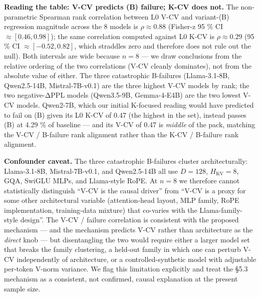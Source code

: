 \documentclass[
]{article}
\begin{document}
\textbf{Reading the table: V-CV predicts (B) failure; K-CV does not.}
The non-parametric Spearman rank correlation between L0 V-CV and
variant-(B) regression magnitude across the 8 models is
\(\rho \approx 0.88\) (Fisher-z 95 \% CI \(\approx [0.46, 0.98]\)); the
same correlation computed against L0 K-CV is \(\rho \approx 0.29\) (95
\% CI \(\approx [-0.52, 0.82]\), which straddles zero and therefore does
not rule out the null). Both intervals are wide because \(n = 8\) --- we
draw conclusions from the relative ordering of the two correlations
(V-CV cleanly dominates), not from the absolute value of either. The
three catastrophic B-failures (Llama-3.1-8B, Qwen2.5-14B,
Mistral-7B-v0.1) are the three highest V-CV models by rank; the two
negative-ΔPPL models (Qwen3.5-9B, Gemma-4-E4B) are the two lowest V-CV
models. Qwen2-7B, which our initial K-focused reading would have
predicted to fail on (B) given its L0 K-CV of 0.47 (the highest in the
set), instead passes (B) at 4.29 \% of baseline --- and its V-CV of 0.47
is \emph{middle} of the pack, matching the V-CV / B-failure rank
alignment rather than the K-CV / B-failure rank alignment.

\textbf{Confounder caveat.} The three catastrophic B-failures cluster
architecturally: Llama-3.1-8B, Mistral-7B-v0.1, and Qwen2.5-14B all use
\(D = 128\), \(H_{\mathrm{KV}} = 8\), GQA, SwiGLU MLPs, and Llama-style
RoPE. At \(n = 8\) we therefore cannot statistically distinguish ``V-CV
is the causal driver'' from ``V-CV is a proxy for some other
architectural variable (attention-head layout, MLP family, RoPE
implementation, training-data mixture) that co-varies with the
Llama-family-style design''. The V-CV / failure correlation is
consistent with the proposed mechanism --- and the mechanism predicts
V-CV rather than architecture as the \emph{direct} knob --- but
disentangling the two would require either a larger model set that
breaks the family clustering, a held-out family in which one can perturb
V-CV independently of architecture, or a controlled-synthetic model with
adjustable per-token V-norm variance. We flag this limitation explicitly
and treat the §5.3 mechanism as a consistent, not confirmed, causal
explanation at the present sample size.
\end{document}
